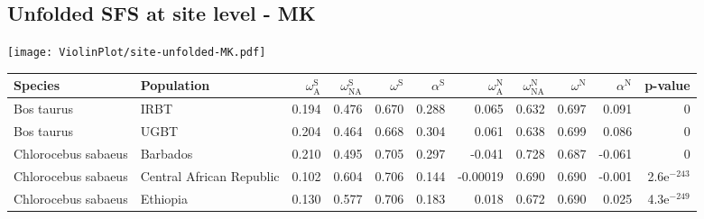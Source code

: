 \subsection{Unfolded SFS at site level - MK} 
\begin{center}
\texttt{[image: ViolinPlot/site-unfolded-MK.pdf]} 
\begin{adjustbox}{width = 1\textwidth}
\begin{tabular}{llrrrrrrrrr}
\toprule
             Species &                Population & $\omega_{\textrm{A}}^{\textrm{S}}$ & $\omega_{\textrm{NA}}^{\textrm{S}}$ & $\omega^{\textrm{S}}$ & $\alpha^{\textrm{S}}$ & $\omega_{\textrm{A}}^{\textrm{N}}$ & $\omega_{\textrm{NA}}^{\textrm{N}}$ & $\omega^{\textrm{N}}$ & $\alpha^{\textrm{N}}$ &       p-value \\
\midrule
          Bos taurus &                      IRBT &                              0.194 &                               0.476 &                 0.670 &                 0.288 &                              0.065 &                               0.632 &                 0.697 &                 0.091 &             0 \\
          Bos taurus &                      UGBT &                              0.204 &                               0.464 &                 0.668 &                 0.304 &                              0.061 &                               0.638 &                 0.699 &                 0.086 &             0 \\
 Chlorocebus sabaeus &                  Barbados &                              0.210 &                               0.495 &                 0.705 &                 0.297 &                             -0.041 &                               0.728 &                 0.687 &                -0.061 &             0 \\
 Chlorocebus sabaeus &  Central African Republic &                              0.102 &                               0.604 &                 0.706 &                 0.144 &                           -0.00019 &                               0.690 &                 0.690 &                -0.001 & 2.6e$^{-243}$ \\
 Chlorocebus sabaeus &                  Ethiopia &                              0.130 &                               0.577 &                 0.706 &                 0.183 &                              0.018 &                               0.672 &                 0.690 &                 0.025 & 4.3e$^{-249}$ \\

\end{tabular}
\end{adjustbox}
\end{center}
